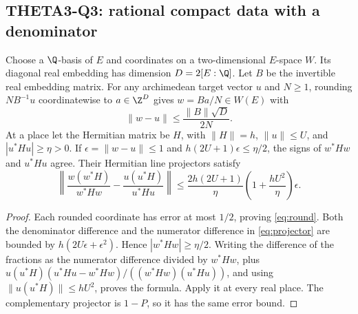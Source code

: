 
\subsection{THETA3-Q3: rational compact data with a denominator}\label{Q3}
Choose a $\Q$-basis of $E$ and coordinates on a two-dimensional $E$-space $W$. Its diagonal real embedding has dimension $D=2[E:\Q]$. Let $B$ be the invertible real embedding matrix. For any archimedean target vector $u$ and $N\geq1$, rounding $NB^{-1}u$ coordinatewise to $a\in\Z^D$ gives $w=Ba/N\in W(E)$ with
\begin{equation}\label{eq:round}
 \|w-u\|\leq\frac{\|B\|\sqrt D}{2N}.
\end{equation}
At a place let the Hermitian matrix be $H$, with $\|H\|=h$, $\|u\|\leq U$, and $|u^*Hu|\geq\eta>0$. If $\epsilon=\|w-u\|\leq1$ and
$h(2U+1)\epsilon\leq\eta/2$, the signs of $w^*Hw$ and $u^*Hu$ agree. Their Hermitian line projectors satisfy
\begin{equation}\label{eq:projector}
 \left\|\frac{w(w^*H)}{w^*Hw}-\frac{u(u^*H)}{u^*Hu}\right\|
 \leq \frac{2h(2U+1)}{\eta}
       \left(1+\frac{hU^2}{\eta}\right)\epsilon.
\end{equation}
\begin{proof}
Each rounded coordinate has error at most $1/2$, proving \eqref{eq:round}. Both the denominator difference and the numerator difference in \eqref{eq:projector} are bounded by
$h(2U\epsilon+\epsilon^2)$. Hence $|w^*Hw|\geq\eta/2$. Writing the difference of the fractions as the numerator difference divided by $w^*Hw$, plus
$u(u^*H)(u^*Hu-w^*Hw)/((w^*Hw)(u^*Hu))$, and using
$\|u(u^*H)\|\leq hU^2$, proves the formula. Apply it at every real place. The complementary projector is $1-P$, so it has the same error bound.
\end{proof}

